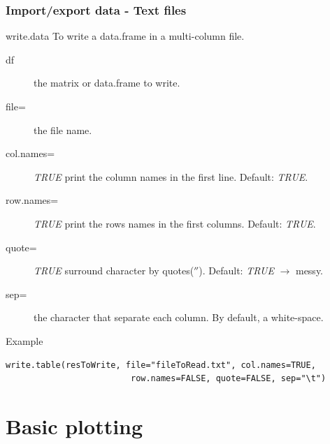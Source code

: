 \documentclass[10pt]{beamer}
\newenvironment{xframe}[2][]
  {\begin{frame}[fragile,environment=xframe,#1]
  \frametitle{#2}}
  {\end{frame}}
\begin{document}
\begin{xframe}[shrink=10]{Import/export data - Text files}
  \begin{block}{{\sf write.data}}
    To write a {\sf data.frame} in a multi-column file.
    \begin{description}
    \item[df] the {\sf matrix} or {\sf data.frame} to write.
    \item[file=] the file name.
    \item[col.names=] {\it TRUE} print the column names in the first line. Default: {\it TRUE}.
    \item[row.names=] {\it TRUE} print the rows names in the first columns. Default: {\it TRUE}.
    \item[quote=] {\it TRUE} surround {\sf character} by quotes($''$). Default: {\it TRUE} $\rightarrow$ messy. 
    \item[sep=] the character that separate each column. By default, a white-space.
    \end{description}
  \end{block}
  \begin{exampleblock}{Example}
\begin{verbatim}
write.table(resToWrite, file="fileToRead.txt", col.names=TRUE, 
                         row.names=FALSE, quote=FALSE, sep="\t")
\end{verbatim}  
  \end{exampleblock}
\end{xframe}

\section{Basic plotting}
\end{document}

